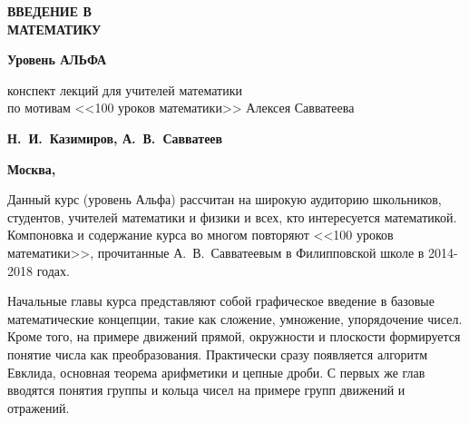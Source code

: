 {\thispagestyle{empty}


\begin{flushright}
\quad

\vspace{2cm}

{\fontsize{100pt}{0pt}\bfseries\sffamily ВВЕДЕНИЕ В\\[20pt] МАТЕМАТИКУ}

\vspace{15mm}

{\fontsize{25pt}{0pt}\bfseries\sffamily Уровень АЛЬФА}

\vspace{2cm}

{\fontsize{20pt}{22pt}\sffamily конспект лекций для учителей математики\\
по мотивам <<100 уроков математики>> Алексея Савватеева\\[5pt]
}

\vspace{2cm}

{\Large\bfseries\sffamily 	Н.~И.~Казимиров, А.~В.~Савватеев}

\vfill

{\Large\bfseries\sffamily 	Москва, \number\year}
\end{flushright}
}



\markboth{}{}

\clearpage
\renewcommand*\contentsname{\vspace{-20mm}\quad\hfill\Large\bfseries\sffamily\MakeUppercase{Содержание}\vspace{2mm}\textcolor{darkred}{\hrule}\thispagestyle{empty}}
\tableofcontents
 


Данный курс (уровень Альфа) рассчитан на широкую аудиторию школьников, студентов, учителей математики и физики и всех, кто интересуется математикой. Компоновка и содержание курса во многом повторяют <<100 уроков математики>>, прочитанные А.~В.~Савватеевым в Филипповской школе в 2014-2018 годах.

Начальные главы курса представляют собой графическое введение в базовые математические концепции, такие как сложение, умножение, упорядочение чисел. Кроме того, на примере движений прямой, окружности и плоскости формируется понятие числа как преобразования.
Практически сразу появляется алгоритм Евклида, основная теорема арифметики и цепные дроби.
С первых же глав вводятся понятия группы и кольца чисел на примере групп движений и отражений.

